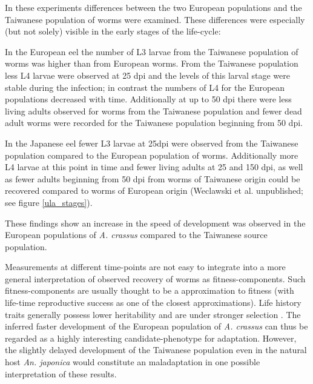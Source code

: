 In these experiments differences between the two European populations
and the Taiwanese population of worms were examined. These differences
were especially (but not solely) visible in the early stages of the
life-cycle:

In the European eel the number of L3 larvae from the Taiwanese
population of worms was higher than from European worms. From the
Taiwanese population less L4 larvae were observed at 25 dpi and the
levels of this larval stage were stable during the infection; in
contrast the numbers of L4 for the European populations decreased with
time. Additionally at up to 50 dpi there were less living adults
observed for worms from the Taiwanese population and fewer dead adult
worms were recorded for the Taiwanese population beginning from 50
dpi.

In the Japanese eel fewer L3 larvae at 25dpi were observed from the
Taiwanese population compared to the European population of
worms. Additionally more L4 larvae at this point in time and fewer
living adults at 25 and 150 dpi, as well as fewer adults beginning
from 50 dpi from worms of Taiwanese origin could be recovered compared
to worms of European origin (Weclawski et al. unpublished; see figure
\ref{ula_stages}).

These findings show an increase in the speed of development was
observed in the European populations of \textit{A. crassus} compared
to the Taiwanese source population.

Measurements at different time-points are not easy to integrate into a
more general interpretation of observed recovery of worms as
fitness-components. Such fitness-components are usually thought to be
a approximation to fitness (with life-time reproductive success as one
of the closest approximations). Life history traits generally possess
lower heritability and are under stronger selection
\cite{pmid3316130}. The inferred faster development of the European
population of \textit{A. crassus} can thus be regarded as a highly
interesting candidate-phenotype for adaptation. However, the slightly
delayed development of the Taiwanese population even in the natural
host \textit{An. japonica} would constitute an maladaptation
\cite{pmid21708731} in one possible interpretation of these results.

